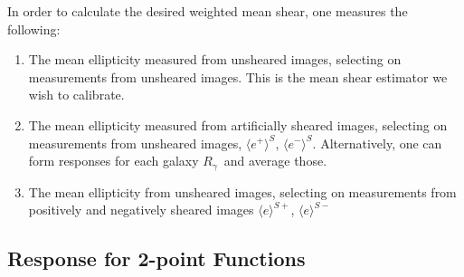 \documentclass[iop]{emulateapj}
\newcommand{\vest}{\mbox{\boldmath $e$}}
\newcommand{\mcalRpsf}{$R^{p}$}
\newcommand{\mcalRg}{\mbox{\boldmath $R_\gamma$}}
\begin{document}






In order to calculate the desired weighted mean shear, one measures the
following:
\begin{enumerate}
	\item The mean ellipticity measured from unsheared images, selecting on
        measurements from unsheared images.   This is the mean shear estimator
		we wish to calibrate.
	\item The mean ellipticity measured from artificially sheared images, selecting
        on measurements from unsheared images,  $\langle e^+ \rangle^S$, $\langle e^- \rangle^S$. Alternatively, 
        one can form responses for each galaxy \mcalRg\ and average those.
    \item The mean ellipticity from unsheared images, selecting on measurements
        from positively and negatively sheared images $\langle e \rangle^{S+}$, $\langle e \rangle^{S-}$
\end{enumerate}





\subsection{Response for 2-point Functions} \label{sec:Rtwopt}
\end{document}
